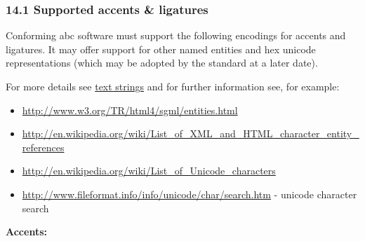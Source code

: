 \documentclass[oneside]{book}
\begin{document}
\hypertarget{supported_accents_ligatures}{\subsubsection{14.1 Supported
accents \& ligatures}\label{supported_accents_ligatures}}

Conforming abc software must support the following encodings for accents
and ligatures. It may offer support for other named entities and hex
unicode representations (which may be adopted by the standard at a later
date).

For more details see \protect\hyperlink{text_strings}{text strings} and
for further information see, for example:

\begin{itemize}
\item
  \url{http://www.w3.org/TR/html4/sgml/entities.html}
\item
  \url{http://en.wikipedia.org/wiki/List_of_XML_and_HTML_character_entity_references}
\item
  \url{http://en.wikipedia.org/wiki/List_of_Unicode_characters}
\item
  \url{http://www.fileformat.info/info/unicode/char/search.htm} -
  unicode character search
\end{itemize}

\textbf{Accents:}
\end{document}
